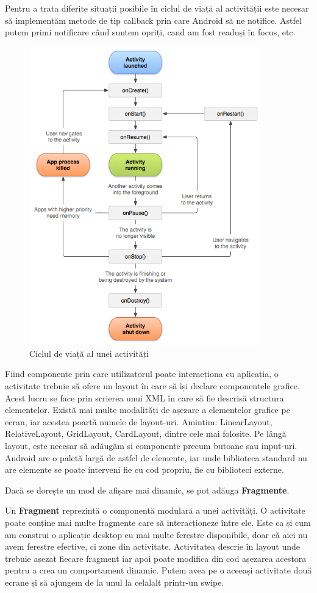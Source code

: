 \documentclass[12pt,a4paper]{article}
\begin{document}
Pentru a trata diferite situații posibile în ciclul de viață al activității este necesar să implementăm metode de tip callback prin care Android să ne notifice. Astfel putem primi notificare când suntem opriți, cand am fost readuși în focus, etc. 

\begin{figure}[h]
\centering
\includegraphics[width=10cm]{figures/activity_lifecycle.png}
\caption{Ciclul de viață al unei activități}
\end{figure}

Fiind componente prin care utilizatorul poate interacționa cu aplicația, o activitate trebuie să ofere un layout în care să își declare componentele grafice. Acest lucru se face prin scrierea unui XML în care să fie descrisă structura elementelor. Există mai multe modalități de așezare a elementelor grafice pe ecran, iar acestea poartă numele de layout-uri. Amintim: LinearLayout, RelativeLayout, GridLayout, CardLayout, dintre cele mai folosite. Pe lângă layout, este necesar să adăugăm și componente precum butoane sau input-uri. Android are o paletă largă de astfel de elemente, iar unde biblioteca standard nu are elemente se poate interveni fie cu cod propriu, fie cu biblioteci externe.

Dacă se dorește un mod de afișare mai dinamic, se pot adăuga \textbf{Fragmente}.

Un \textbf{Fragment} reprezintă o componentă modulară a unei activități. O activitate poate conține mai multe fragmente care să interacționeze între ele. Este ca și cum am construi o aplicație desktop cu mai multe ferestre disponibile, doar că aici nu avem ferestre efective, ci zone din activitate. Activitatea descrie în layout unde trebuie așezat fiecare fragment iar apoi poate modifica din cod așezarea acestora pentru a crea un comportament dinamic. Putem avea pe o aceeași activitate două ecrane și să ajungem de la unul la celalalt printr-un swipe.
\end{document}
